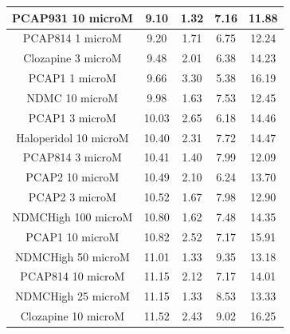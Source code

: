 \begin{table}[h!]
\begin{tabular}{|c|c|c|c|c|}
PCAP931 10 microM      & 9.10   & 1.32 & 7.16 & 11.88 \\ \hline
PCAP814 1 microM       & 9.20   & 1.71 & 6.75 & 12.24 \\ \hline
Clozapine 3 microM     & 9.48  & 2.01 & 6.38 & 14.23 \\ \hline
PCAP1 1 microM         & 9.66  & 3.30  & 5.38 & 16.19 \\ \hline
NDMC 10 microM         & 9.98  & 1.63 & 7.53 & 12.45 \\ \hline
PCAP1 3 microM         & 10.03 & 2.65 & 6.18 & 14.46 \\ \hline
Haloperidol 10 microM  & 10.40  & 2.31 & 7.72 & 14.47 \\ \hline
PCAP814 3 microM       & 10.41 & 1.40  & 7.99 & 12.09 \\ \hline
PCAP2 10 microM        & 10.49 & 2.10  & 6.24 & 13.70  \\ \hline
PCAP2 3 microM         & 10.52 & 1.67 & 7.98 & 12.90  \\ \hline
NDMCHigh 100 microM    & 10.80  & 1.62 & 7.48 & 14.35 \\ \hline
PCAP1 10 microM        & 10.82 & 2.52 & 7.17 & 15.91 \\ \hline
NDMCHigh 50 microM     & 11.01 & 1.33 & 9.35 & 13.18 \\ \hline
PCAP814 10 microM      & 11.15 & 2.12 & 7.17 & 14.01 \\ \hline
NDMCHigh 25 microM     & 11.15 & 1.33 & 8.53 & 13.33 \\ \hline
Clozapine 10 microM    & 11.52 & 2.43 & 9.02 & 16.25 \\ \hline
\end{tabular}
\end{table}
\newpage
